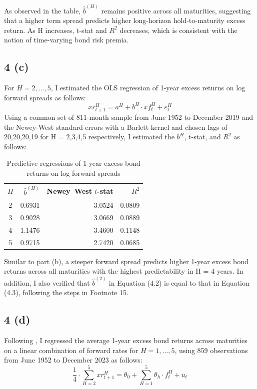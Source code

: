 \documentclass[11pt]{article}
\begin{document}
As observed in the table, $\hat{b}^{(H)}$ remains positive across all maturities, suggesting that a higher term spread predicts higher long-horizon hold-to-maturity excess return. As H increases, t-stat and $R^{2}$ decreases, which is consistent with the notion of time-varying bond risk premia.  

\subsection*{4 (c)} 
For $H = 2,\ldots,5$, I estimated the OLS regression of 1-year excess returns on log forward spreads as follows: 
\[
    xr_{t+1}^{H} = a^{H} + b^{H} \cdot xf_{t}^{H} + e_{t}^{H}
\]
Using a common set of 811-month sample from June 1952 to December 2019 and the Newey-West standard errors with a Barlett kernel and chosen lags of 20,20,20,19 for H = 2,3,4,5 respectively, I estimated the $b^{H}$, t-stat, and $R^{2}$ as follows: 
\begin{table}[H]
  \centering
  \caption{Predictive regressions of 1-year excess bond returns on log forward spreads}
  \label{tab:q4c}
  \begin{tabular}{crrr}
    \toprule
    $H$ & $\hat{b}^{(H)}$ & Newey--West $t$-stat & $R^2$ \\
    \midrule
    2 & 0.6931 & 3.0524 & 0.0809 \\
    3 & 0.9028 & 3.0669 & 0.0889 \\
    4 & 1.1476 & 3.4600 & 0.1148 \\
    5 & 0.9715 & 2.7420 & 0.0685 \\
    \bottomrule
  \end{tabular}
\end{table}

Similar to part (b), a steeper forward spread predicts higher 1-year excess bond returns across all maturities with the highest predictability in H = 4 years. In addition, I also verified that $\hat{b}^{(2)}$ in Equation (4.2) is equal to that in Equation (4.3), following the steps in Footnote 15. 

\subsection*{4 (d)} 
Following \cite{cochrane2005bond}, I regressed the average 1-year excess bond returns across maturities on a linear combination of forward rates for $H = 1,\ldots,5$, using 859 observations from June 1952 to December 2023 as follows: 
\[
    \frac{1}{4} \cdot \sum_{H=2}^{5} xr_{t+1}^{H} = \theta_{0} + \sum_{H=1}^{5} \theta_{h} \cdot f_{t}^{H} + u_t
\]
\end{document}
